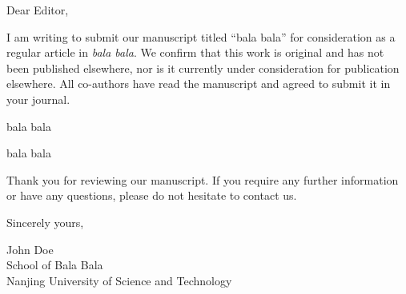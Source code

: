 \documentclass{article}
\begin{document}
Dear Editor,

\bigskip %


I am writing to submit our manuscript titled ``bala bala'' for consideration as a regular article in \textit{bala bala}. We confirm that this work is original and has not been published elsewhere, nor is it currently under consideration for publication elsewhere. All co-authors have read the manuscript and agreed to submit it in your journal.

bala bala

\vspace{6\baselineskip}

bala bala

\vspace{6\baselineskip}

Thank you for reviewing our manuscript. If you require any further information or have any questions, please do not hesitate to contact us.

\bigskip %

Sincerely yours,

\vspace{20pt} %

John Doe \\
School of Bala Bala \\
Nanjing University of Science and Technology \\
\end{document}
